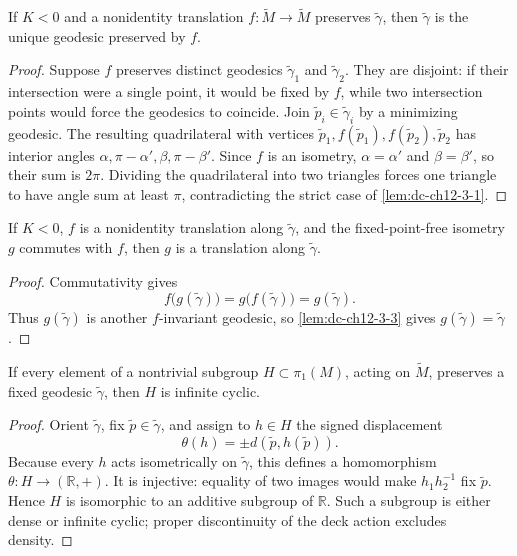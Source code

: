 \begin{lemma}
  \label{lem:dc-ch12-3-3}
  If $K<0$ and a nonidentity translation $f:\tilde M\to\tilde M$ preserves
  $\tilde\gamma$, then $\tilde\gamma$ is the unique geodesic preserved by $f$.
\end{lemma}
\begin{proof}
  \sketch
  Suppose $f$ preserves distinct geodesics $\tilde\gamma_1$ and
  $\tilde\gamma_2$. They are disjoint: if their intersection were a single
  point, it would be fixed by $f$, while two intersection points would force
  the geodesics to coincide. Join
  $\tilde p_i\in\tilde\gamma_i$ by a minimizing geodesic. The resulting
  quadrilateral with vertices
  $\tilde p_1,f(\tilde p_1),f(\tilde p_2),\tilde p_2$ has interior angles
  $\alpha,\pi-\alpha',\beta,\pi-\beta'$. Since $f$ is an isometry,
  $\alpha=\alpha'$ and $\beta=\beta'$, so their sum is $2\pi$. Dividing the
  quadrilateral into two triangles forces one triangle to have angle sum at
  least $\pi$, contradicting the strict case of
  \cref{lem:dc-ch12-3-1}.
\end{proof}

\begin{lemma}
  \label{lem:dc-ch12-3-4}
  If $K<0$, $f$ is a nonidentity translation along $\tilde\gamma$, and the
  fixed-point-free isometry $g$ commutes with $f$, then $g$ is a translation
  along $\tilde\gamma$.
\end{lemma}
\begin{proof}
  \sketch
  Commutativity gives
  \[
    f\bigl(g(\tilde\gamma)\bigr)
    =g\bigl(f(\tilde\gamma)\bigr)=g(\tilde\gamma).
  \]
  Thus $g(\tilde\gamma)$ is another $f$-invariant geodesic, so
  \cref{lem:dc-ch12-3-3} gives $g(\tilde\gamma)=\tilde\gamma$.
\end{proof}

\begin{lemma}
  \label{lem:dc-ch12-3-5}
  If every element of a nontrivial subgroup $H\subset\pi_1(M)$, acting on
  $\tilde M$, preserves a fixed geodesic $\tilde\gamma$, then $H$ is infinite
  cyclic.
\end{lemma}
\begin{proof}
  \sketch
  Orient $\tilde\gamma$, fix $\tilde p\in\tilde\gamma$, and assign to
  $h\in H$ the signed displacement
  \[
    \theta(h)=\pm d(\tilde p,h(\tilde p)).
  \]
  Because every $h$ acts isometrically on $\tilde\gamma$, this defines a
  homomorphism $\theta:H\to(\mathbb R,+)$. It is injective: equality of two
  images would make $h_1h_2^{-1}$ fix $\tilde p$. Hence $H$ is isomorphic to
  an additive subgroup of $\mathbb R$. Such a subgroup is either dense or
  infinite cyclic; proper discontinuity of the deck action excludes density.
\end{proof}

